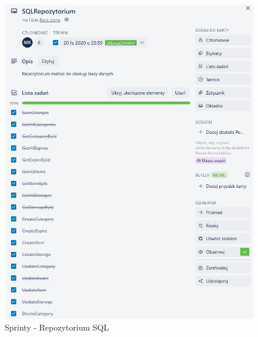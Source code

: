 \documentclass[12pt,a4paper]{article}
\begin{document}
				\begin{figure}[H]
			\centering
			\includegraphics[width=\textwidth]{img/SQLRepo_Sprint.png}
			\caption{Sprinty - Repozytorium SQL}
			\label{fig:sprint-SQLRepo}
		\end{figure}
\end{document}
